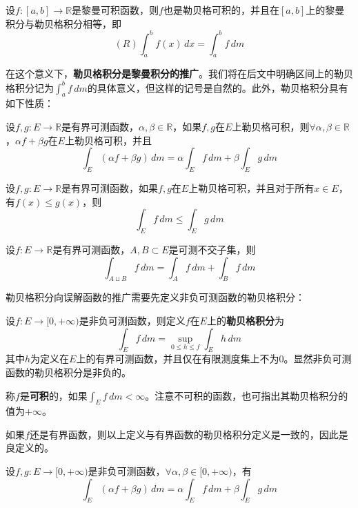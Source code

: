 \documentclass{ctexbook}
\begin{document}
\begin{theorem}
    设$f:[a,b]\to\mathbb{R}$是黎曼可积函数，则$f$也是勒贝格可积的，并且在$[a,b]$上的黎曼积分与勒贝格积分相等，即
    \[(R)\int_{a}^{b}f(x)\,dx=\int_{a}^{b}f\,dm\]
\end{theorem}

在这个意义下，\textbf{勒贝格积分是黎曼积分的推广}。我们将在后文中明确区间上的勒贝格积分记为$\int_{a}^{b}f\,dm$的具体意义，但这样的记号是自然的。此外，勒贝格积分具有如下性质：
\begin{proposition}[有界可测函数的勒贝格积分的线性性]
    设$f,g:E\to\mathbb{R}$是有界可测函数，$\alpha,\beta\in\mathbb{R}$，如果$f,g$在$E$上勒贝格可积，则$\forall \alpha,\beta\in\mathbb{R}$，$\alpha f+\beta g$在$E$上勒贝格可积，并且
    \[\int_{E}(\alpha f+\beta g)\,dm=\alpha\int_{E}f\,dm+\beta\int_{E}g\,dm\]
\end{proposition}
\begin{corollary}[有界可测函数的勒贝格积分的单调性]
    设$f,g:E\to\mathbb{R}$是有界可测函数，如果$f,g$在$E$上勒贝格可积，并且对于所有$x\in E$，有$f(x)\leq g(x)$，则
    \[\int_{E}f\,dm\leq \int_{E}g\,dm\]
\end{corollary}
\begin{corollary}[有界可测函数的勒贝格积分的区域可加性]
    设$f:E\to\mathbb{R}$是有界可测函数，$A,B\subset E$是可测不交子集，则
    \[\int_{A\sqcup B}f\,dm=\int_{A}f\,dm+\int_{B}f\,dm\]
\end{corollary}

勒贝格积分向误解函数的推广需要先定义非负可测函数的勒贝格积分：

\begin{definition}[非负可测函数的勒贝格积分]
    设$f:E\to[0,+\infty)$是非负可测函数，则定义$f$在$E$上的\textbf{勒贝格积分}为
    \[\int_{E}f\,dm=\sup_{0\leq h\leq f}\int_{E}h\,dm\]
    其中$h$为定义在$E$上的有界可测函数，并且仅在有限测度集上不为0。显然非负可测函数的勒贝格积分是非负的。
    
    称$f$是\textbf{可积}的，如果$\int_{E}f\,dm<\infty$。注意不可积的函数，也可指出其勒贝格积分的值为$+\infty$。
\end{definition}

如果$f$还是有界函数，则以上定义与有界函数的勒贝格积分定义是一致的，因此是良定义的。

\begin{theorem}[非负可测函数的勒贝格积分的线性性]
    设$f,g:E\to[0,+\infty)$是非负可测函数，$\forall\alpha,\beta\in[0,+\infty)$，有
    \[\int_{E}(\alpha f+\beta g)\,dm=\alpha\int_{E}f\,dm+\beta\int_{E}g\,dm\]
\end{theorem}
\end{document}

